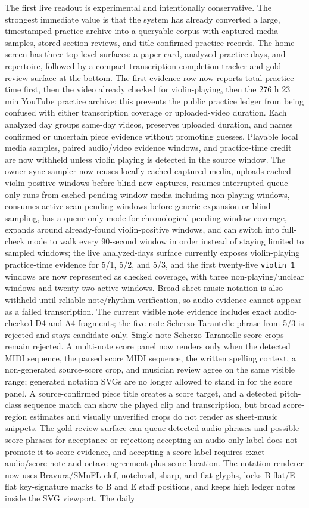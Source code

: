 \documentclass[12pt,letterpaper]{article}
\begin{document}
The first live readout is experimental and intentionally conservative. The strongest immediate value is that the system has already converted a large, timestamped practice archive into a queryable corpus with captured media samples, stored section reviews, and title-confirmed practice records. The home screen has three top-level surfaces: a paper card, analyzed practice days, and repertoire, followed by a compact transcription-completion tracker and gold review surface at the bottom. The first evidence row now reports total practice time first, then the video already checked for violin-playing, then the 276 h 23 min YouTube practice archive; this prevents the public practice ledger from being confused with either transcription coverage or uploaded-video duration. Each analyzed day groups same-day videos, preserves uploaded duration, and names confirmed or uncertain piece evidence without promoting guesses. Playable local media samples, paired audio/video evidence windows, and practice-time credit are now withheld unless violin playing is detected in the source window. The owner-sync sampler now reuses locally cached captured media, uploads cached violin-positive windows before blind new captures, resumes interrupted queue-only runs from cached pending-window media including non-playing windows, consumes active-scan pending windows before generic expansion or blind sampling, has a queue-only mode for chronological pending-window coverage, expands around already-found violin-positive windows, and can switch into full-check mode to walk every 90-second window in order instead of staying limited to sampled windows; the live analyzed-days surface currently exposes violin-playing practice-time evidence for 5/1, 5/2, and 5/3, and the first twenty-five \texttt{violin 1} windows are now represented as checked coverage, with three non-playing/unclear windows and twenty-two active windows. Broad sheet-music notation is also withheld until reliable note/rhythm verification, so audio evidence cannot appear as a failed transcription. The current visible note evidence includes exact audio-checked D4 and A4 fragments; the five-note Scherzo-Tarantelle phrase from 5/3 is rejected and stays candidate-only. Single-note Scherzo-Tarantelle score crops remain rejected. A multi-note score panel now renders only when the detected MIDI sequence, the parsed score MIDI sequence, the written spelling context, a non-generated source-score crop, and musician review agree on the same visible range; generated notation SVGs are no longer allowed to stand in for the score panel. A source-confirmed piece title creates a score target, and a detected pitch-class sequence match can show the played clip and transcription, but broad score-region estimates and visually unverified crops do not render as sheet-music snippets. The gold review surface can queue detected audio phrases and possible score phrases for acceptance or rejection; accepting an audio-only label does not promote it to score evidence, and accepting a score label requires exact audio/score note-and-octave agreement plus score location. The notation renderer now uses Bravura/SMuFL clef, notehead, sharp, and flat glyphs, locks B-flat/E-flat key-signature marks to B and E staff positions, and keeps high ledger notes inside the SVG viewport. The daily 
\end{document}
